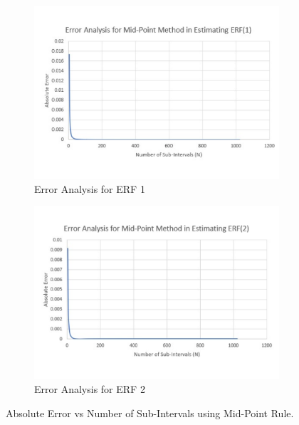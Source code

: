 \documentclass[titlepage, 11pt]{article}
\begin{document}
\begin{figure}[ht]
\begin{subfigure}{.5\textwidth}
  \centering
  \includegraphics[width=\linewidth]{MP2ERF1.pdf}
  \caption{Error Analysis for ERF 1}
  \label{fig:q2a1}
\end{subfigure}
\begin{subfigure}{.5\textwidth}
  \centering
  \includegraphics[width=\linewidth]{MP2ERF2.pdf}
  \caption{Error Analysis for ERF 2}
  \label{fig:q2a2}
\end{subfigure}
\caption{Absolute Error vs Number of Sub-Intervals using Mid-Point Rule.}
\label{fig:q2a}
\end{figure}
\end{document}
